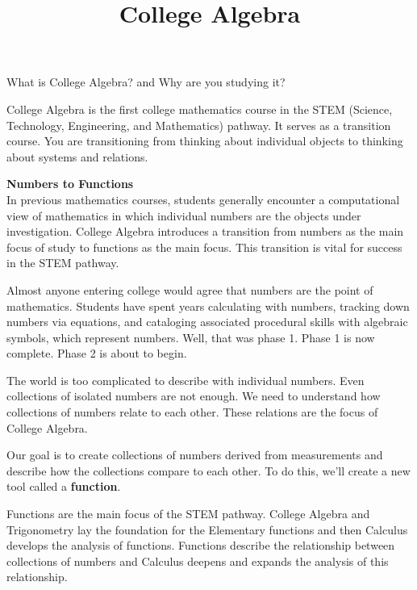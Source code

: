 \documentclass{ximera}
\title{College Algebra}
\begin{document}
\begin{abstract}
\end{abstract}

\maketitle

What is College Algebra? and Why are you studying it?

College Algebra is the first college mathematics course in the STEM (Science, Technology, Engineering, and Mathematics) pathway. It serves as a transition course. You are transitioning from thinking about individual objects to thinking about systems and relations.

\textbf{Numbers to Functions} \\
In previous mathematics courses, students generally encounter a computational view of mathematics in which individual numbers are the objects under investigation. College Algebra introduces a transition from numbers as the main focus of study to functions as the main focus. This transition is vital for success in the STEM pathway.

Almost anyone entering college would agree that numbers are the point of mathematics.  Students have spent years calculating with numbers, tracking down numbers via equations, and cataloging associated procedural skills with algebraic symbols, which represent numbers. Well, that was phase 1.  Phase 1 is now complete.  Phase 2 is about to begin.

The world is too complicated to describe with individual numbers. Even collections of isolated numbers are not enough. We need to understand how collections of numbers relate to each other. These relations are the focus of College Algebra.

Our goal is to create collections of numbers derived from measurements and describe how the collections compare to each other. To do this, we'll create a new tool called a \textbf{function}.

Functions are the main focus of the STEM pathway.  College Algebra and Trigonometry lay the foundation for the Elementary functions and then Calculus develops the analysis of functions.  Functions describe the relationship between collections of numbers and Calculus deepens and expands the analysis of this relationship.
\end{document}
